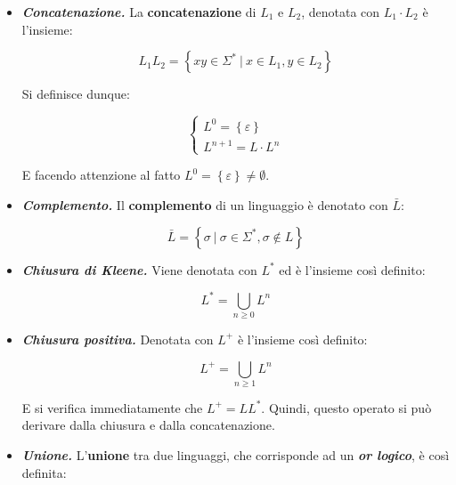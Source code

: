 \documentclass[a4paper]{article}
\begin{document}
	\begin{itemize}
		\item[\ding{45}] \textcolor{Red3}{\textbf{\emph{Concatenazione.}}} La \textbf{concatenazione} di $L_1$ e $L_2$, denotata con $L_1 \cdot L_2$ è l'insieme:
		
		\begin{equation*}
			L_{1}L_{2} = \left\{xy \in \Sigma^{*} \: | \: x \in L_1, y \in L_2 \right\}
		\end{equation*}
	
		Si definisce dunque:
	
		\begin{equation*}
			\begin{cases}
				L^{0} = \left\{\varepsilon\right\} \\
				L^{n+1} = L \cdot L^{n}
			\end{cases}
		\end{equation*}
		
		E facendo attenzione al fatto $L^{0} = \left\{\varepsilon\right\} \ne \emptyset$.
	
		\item[\ding{45}] \textcolor{Red3}{\textbf{\emph{Complemento.}}} Il \textbf{complemento} di un linguaggio è denotato con $\bar{L}$:
		
		\begin{equation*}
			\bar{L} = \left\{\sigma \: | \: \sigma \in \Sigma^*, \sigma \notin L\right\}
		\end{equation*}
	
		\item[\ding{45}] \textcolor{Red3}{\textbf{\emph{Chiusura di Kleene.}}} Viene denotata con $L^{*}$ ed è l'insieme così definito:
		
		\begin{equation*}
			L^{*} = \bigcup_{n \ge 0} L^n
		\end{equation*}
	
		\item[\ding{45}] \textcolor{Red3}{\textbf{\emph{Chiusura positiva.}}} Denotata con $L^{+}$ è l'insieme così definito:
		
		\begin{equation*}
			L^{+} = \bigcup_{n \ge 1} L^n
		\end{equation*}
	
		E si verifica immediatamente che $L^{+} = LL^{*}$. Quindi, questo operato si può derivare dalla chiusura e dalla concatenazione.
		
		\item[\ding{45}] \textcolor{Red3}{\textbf{\emph{Unione.}}} L'\textbf{unione} tra due linguaggi, che corrisponde ad un \textbf{\emph{or logico}}, è così definita:
		

\end{itemize}
\end{document}

